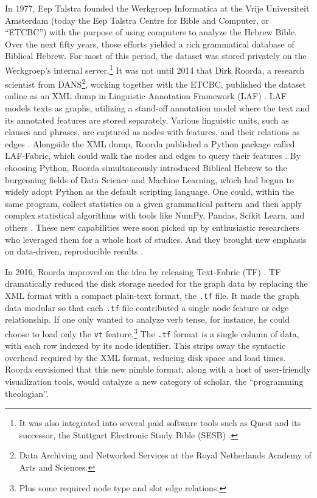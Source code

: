 \documentclass[11pt,a4paper]{article}
\begin{document}
In 1977, Eep Talstra founded the Werkgroep Informatica at the Vrije Universiteit Amsterdam
(today the Eep Talstra Centre for Bible and Computer, or ``ETCBC'') with the purpose of using
computers to analyze the Hebrew Bible.
Over the next fifty years, those efforts yielded a rich grammatical database
of Biblical Hebrew. For most of this period, the dataset was stored privately on the Werkgroep's
internal server.\footnote{
    It was also integrated into several paid software tools such as Quest and its successor,
    the Stuttgart Electronic Study Bible (SESB) \cite{oosting2016}.
}
It was not until 2014 that Dirk Roorda, a research scientist from DANS\footnote{
    Data Archiving and Networked Services at the Royal Netherlands Academy of Arts and Sciences.
}, working together with the ETCBC, published the dataset online as an XML dump in
Linguistic Annotation Framework (LAF) \cite{roorda2014laf}. LAF models texts as graphs,
utilizing a stand-off annotation model where the text and its annotated
features are stored separately. Various linguistic units, such as clauses and phrases, are captured
as nodes with features, and their relations as edges \cite{ide2014laf}.
Alongside the XML dump, Roorda published a Python package called LAF-Fabric, which could
walk the nodes and edges to query their features \cite{roorda2014laf}. By choosing Python, Roorda
simultaneously introduced Biblical Hebrew to the burgeoning fields of Data Science
and Machine Learning, which had begun to widely adopt Python as the default scripting language.
One could, within the same program, collect statistics on a given grammatical pattern and
then apply complex statistical algorithms with tools like NumPy, Pandas, Scikit Learn, and others
\cite{harris2020numpy,mckinney2010pandas,pedregosa2011scikit}.
These new capabilities were soon picked up by enthusiastic researchers who leveraged them for a whole host
of studies. And they brought new emphasis on data-driven, reproducible results
\cite{kalkman2015verbal,naaijer2016parallel,kingham2016song,vanpeursen2019,erwich2021psalms,hojgaard2021roles}.

In 2016, Roorda improved on the idea by releasing Text-Fabric (TF) \cite{textfabricsoftware}. TF
dramatically reduced the disk storage needed for the graph data by replacing the XML format
with a compact plain-text format, the \texttt{.tf} file. It made the graph data modular so that
each \texttt{.tf} file contributed a single node feature or edge relationship. If one only wanted to analyze
verb tense, for instance, he could choose to load only the \texttt{vt} feature.\footnote{
    Plus some required node type and slot edge relations.
}
The \texttt{.tf} format is a single column of data, with each row indexed by its node identifier.
This strips away the syntactic overhead required by the XML format, reducing disk space and load times.
Roorda envisioned that this new nimble format, along with a host of user-friendly visualization tools,
would catalyze a new category of scholar, the ``programming theologian''.
\end{document}
